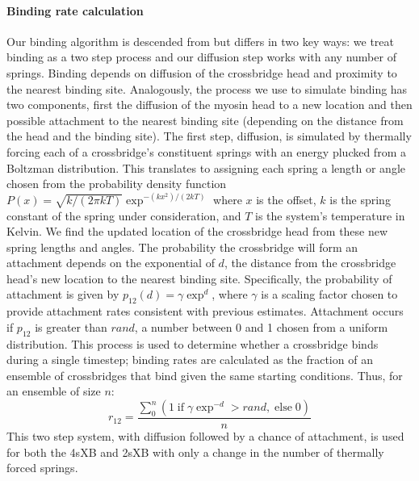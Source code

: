 \documentclass[]{article}
\begin{document}
\paragraph{Binding rate calculation} %
Our binding algorithm is descended from \citet{Tanner:2007:pe115} but differs in two key ways: we treat binding as a two step process and our diffusion step works with any number of springs.
Binding depends on diffusion of the crossbridge head and proximity to the nearest binding site.
Analogously, the process we use to simulate binding has two components, first the diffusion of the myosin head to a new location and then possible attachment to the nearest binding site (depending on the distance from the head and the binding site).
The first step, diffusion, is simulated by thermally forcing each of a crossbridge's constituent springs with an energy plucked from a Boltzman distribution.
This translates to assigning each spring a length or angle chosen from the probability density function $P(x) = \sqrt{k / (2 \pi kT)} \exp^{-(k x^2)/(2 kT)}$ where $x$ is the offset, $k$ is the spring constant of the spring under consideration, and $T$ is the system's temperature in Kelvin.
We find the updated location of the crossbridge head from these new spring lengths and angles.
The probability the crossbridge will form an attachment depends on the exponential of $d$, the distance from the crossbridge head's new location to the nearest binding site.
Specifically, the probability of attachment is given by $p_{12}(d) = \gamma \exp ^{d}$, where $\gamma$ is a scaling factor chosen to provide attachment rates consistent with previous estimates.
Attachment occurs if $p_{12}$ is greater than $rand$, a number between 0 and 1 chosen from a uniform distribution.
This process is used to determine whether a crossbridge binds during a single timestep; binding rates are calculated as the fraction of an ensemble of crossbridges that bind given the same starting conditions. 
Thus, for an ensemble of size $n$: 
$$r_{12} =  \frac{\sum_0^n \left( 1\; \textrm{if}\; \gamma \exp^{-d}>rand ,\; \textrm{else}\; 0 \right)}{n}$$
This two step system, with diffusion followed by a chance of attachment, is used for both the 4sXB and 2sXB with only a change in the number of thermally forced springs.
\end{document}
